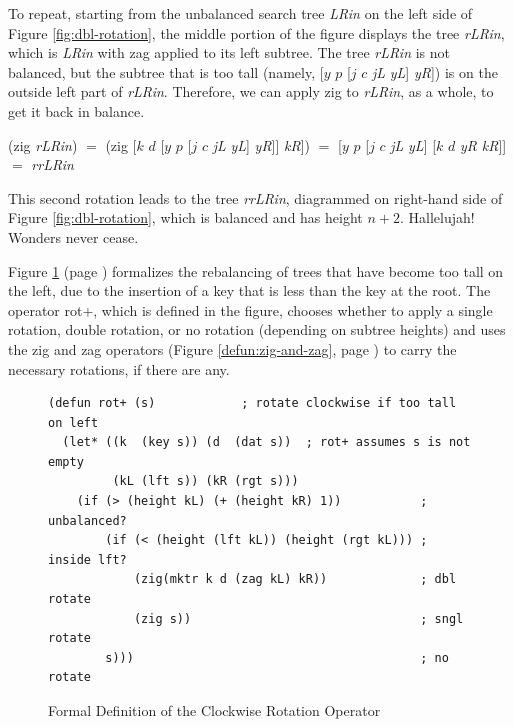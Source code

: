 To repeat, starting from the unbalanced search tree \emph{LRin}
on the left side of Figure \ref{fig:dbl-rotation},
the middle portion of the figure displays the tree \emph{rLRin},
which is \emph{LRin} with \textsf{zag} applied to its left subtree.
The tree \emph{rLRin}
is not balanced, but the subtree that is too tall
(namely, \textsf{[$y$ $p$ [$j$ $c$} \emph{jL} \emph{yL}\textsf{]} \emph{yR}\textsf{]})
is on the outside left part of \emph{rLRin}.
Therefore, we can apply \textsf{zig} to \emph{rLRin}, as a whole,
to get it back in balance.
\begin{center}
\textsf{(zig} \emph{rLRin}\textsf{)} $=$
\textsf{(zig [$k$ $d$ [$y$ $p$ [$j$ $c$} \emph{jL} \emph{yL}\textsf{]} \emph{yR}\textsf{]]} \emph{kR}\textsf{])} $=$
\textsf{[$y$ $p$ [$j$ $c$} \emph{jL} \emph{yL}\textsf{] [$k$ $d$} \emph{yR} \emph{kR}\textsf{]]}
$=$ \emph{rrLRin}
\end{center}
This second rotation leads to
the tree \emph{rrLRin},
diagrammed on right-hand side of
Figure \ref{fig:dbl-rotation},
which is balanced and has height $n+2$.
Hallelujah! Wonders never cease.

Figure \ref{defun:rot+} (page \pageref{defun:rot+})
formalizes the rebalancing of trees
that have become too tall on the left, due to the
insertion of a key that is less than the key at the root.
The operator \textsf{rot}+, which is defined in the figure,
chooses whether to apply a single rotation,
double rotation, or no rotation
(depending on subtree heights)
and uses the \textsf{zig} and \textsf{zag} operators
(Figure \ref{defun:zig-and-zag}, page \pageref{defun:zig-and-zag})
to carry the necessary rotations, if there are any.

\begin{figure}
\begin{center}
\begin{code}
\begin{verbatim}
(defun rot+ (s)            ; rotate clockwise if too tall on left
  (let* ((k  (key s)) (d  (dat s))  ; rot+ assumes s is not empty
         (kL (lft s)) (kR (rgt s)))
    (if (> (height kL) (+ (height kR) 1))           ; unbalanced?
        (if (< (height (lft kL)) (height (rgt kL))) ; inside lft?
            (zig(mktr k d (zag kL) kR))             ; dbl rotate
            (zig s))                                ; sngl rotate
        s)))                                        ; no rotate
\end{verbatim}
\end{code}
\end{center}
\caption{Formal Definition of the Clockwise Rotation Operator}
\label{defun:rot+}
\end{figure}

